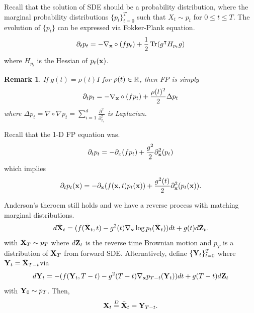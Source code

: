 \documentclass[11pt, a4paper]{article}
\newtheorem{remark}{Remark}
\begin{document}
Recall that the solution of SDE should be a probability distribution,
where the marginal probability distributions $\{p_t\}_{t=0}^T$ such that $X_t\sim p_t$ for $0\leq t\leq T$.
The evolution of $\{p_t\}$ can be expressed via Fokker-Plank equation.
\begin{align}
    \partial_t p_t = -\nabla_{{\bf x}}\circ(fp_t) + \frac{1}{2} \operatorname{Tr}(g^\intercal H_{p_t} g)
\end{align}
where $H_{p_t}$ is the Hessian of $p_t({\bf x})$.

\begin{remark}
    If $g(t) = \rho(t) I$ for $\rho(t)\in\mathbb{R}$, then FP is simply 
    \begin{align}
        \partial_t p_t = -\nabla_{{\bf x}}\circ(fp_t) + \frac{\rho(t)^2}{2} \Delta p_t
    \end{align}
    where $\Delta p_t = \nabla\circ \nabla p_t = \sum_{i=1}^d \frac{\partial^2}{\partial_{x_i}^2}$ is Laplacian.
\end{remark}

Recall that the 1-D FP equation was.
\begin{align}
    \partial_t p_t = -\partial_x(fp_t) + \frac{g^2}{2}\partial_{\bf x}^2 (p_t)
\end{align}
which implies
\begin{align}
    \partial_t p_t({\bf x}) = -\partial_{\bf x}(f({\bf x}, t)p_t({\bf x})) + \frac{g^2(t)}{2}\partial_{\bf x}^2 (p_t({\bf x})).
\end{align}

Anderson's theroem still holds and we have a reverse process with matching marginal distributions.
\begin{align}
    d\bar{{\bf X}}_t = (f(\bar{{\bf X}}_t, t) - g^2(t) \nabla_{\bf x}\log p_t(\bar{{\bf X}}_t))dt+g(t) d\bar{{\bf Z}}_t.
\end{align}
with $\bar{{\bf X}}_T\sim p_T$ where $d\bar{{\bf Z}}_t$ is the reverse time Brownian motion and $p_T$ is a distribution of ${\bf X}_T$ from forward SDE.
Alternatively, define $\{{\bf Y}_t\}_{t=0}^T$ where ${\bf Y}_t= \bar{{\bf X}}_{T-t}$via
\begin{align}
    d{\bf Y}_t =  - (f({\bf Y}_t, T-t) - g^2(T-t)\nabla_{\bf x} p_{T-t}({\bf Y}_t))dt + g(T-t)d{\bf Z}_t
\end{align}
with ${\bf Y}_0\sim p_T$.
Then,
\begin{align}
    {\bf X}_t \stackrel{D}{=} \bar{{\bf X}}_t ={\bf Y}_{T-t}.
\end{align}




\end{document}
